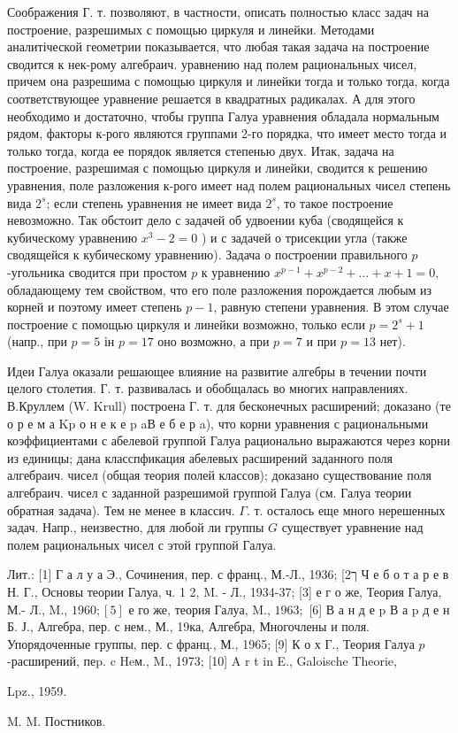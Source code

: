 \documentclass[10pt]{article}
\begin{document}
Соображения Г. т. позволяют, в частности, описать полностью класс задач на построение, разрешимых с помощью циркуля и линейки. Методами аналитіческой геометрии показывается, что любая такая задача на построение сводится к нек-рому алгебраич. уравнению над полем рациональных чисел, причем она разрешима с помощью циркуля и линейки тогда и только тогда, когда соответствующее уравнение решается в квадратных радикалах. А для этого необходимо и достаточно, чтобы группа Галуа уравнения обладала нормальным рядом, факторы к-рого являются группами 2-го порядка, что имеет место тогда и только тогда, когда ее порядок является степенью двух. Итак, задача на построение, разрешимая с помощью циркуля и линейки, сводится к решению уравнения, поле разложения к-рого имеет над полем рациональных чисел степень вида $2^{s}$; если степень уравнения не имеет вида $2^{s}$, то такое построение невозможно. Так обстоит дело с задачей об удвоении куба (сводящейся к кубическому уравнению $x^{3}-2=0$ ) и с задачей о трисекции угла (также сводящейся к кубическому уравнению). Задача о построении правильного $p$-угольника сводится при простом $p$ к уравнению $x^{p-1}+x^{p-2}+\ldots+x+1=0$, обладающему тем свойством, что его поле разложения порождается любым из корней и поэтому имеет степень $p-1$, равную степени уравнения. В этом случае построение с помощью циркуля и линейки возможно, только если $p=2^{s}+1$ (напр., при $p=5$ ін $p=17$ оно возможно, а при $p=7$ и при $p=13$ нет).



Идеи Галуа оказали решающее влияние на развитие алгебры в течении почти целого столетия. Г. т. развивалась и обобщалась во многих направлениях. В.Круллем (W. Krull) построена Г. т. для бесконечных расширений; доказано (те о р е м а $\mathrm{K} \mathrm{p}$ о н е к е $\mathrm{p}$ aВ е б е р a), что корни уравнения с рациональными коэффициентами с абелевой группой Галуа рационально выражаются через корни из единицы; дана класспфикация абелевых расширений заданного поля алгебраич. чисел (общая теория полей классов); доказано существование поля алгебраич. чисел с заданной разрешимой группой Галуа (см. Галуа теории обратная задача). Тем не менее в классич. $\Gamma$. т. осталось еще много нерешенных задач. Напр., неизвестно, для любой ли группы $G$ существует уравнение над полем рациональных чисел с этой группой Галуа.



Лит.: [1] Г а л у а Э., Сочинения, пер. с франц., М.-Л., 1936; [2ך Ч е б о т а р е в Н. Г., Основы теории Галуа, ч. 1 2, M. - Л., 1934-37; [3] е г о же, Теория Галуа, М.- Л., M., $1960 ;[5]$ е го же, теория Галуа, M., $1963 ;$ [6] В а н д е p В а p д е н Б. Ј., Алгебра, пер. с нем., М., 19ка, Алгебра, Многочлены и поля. Упорядоченные группы, пер. с франц., М., 1965; [9] К о х Г., Теория Галуа $p$-расширений, пеp. c Heм., M., 1973; [10] A r t in E., Galoische Theorie,

Lpz., 1959.

M. M. Постников.
\end{document}

